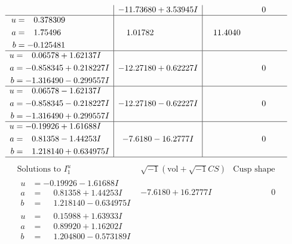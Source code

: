 \documentclass[1p]{elsarticle_modified}
\theoremstyle{definition}
\newcommand{\I}{\sqrt{-1}}
\begin{document}
$$\begin{array}{c|c|c}
 & -11.73680 + 3.53945 I & \phantom{-0.000000 } 0 \\ \hline\begin{aligned}
u &= \phantom{-}0.378309\phantom{ +0.000000I} \\
a &= \phantom{-}1.75496\phantom{ +0.000000I} \\
b &= -0.125481\phantom{ +0.000000I}\end{aligned}
 & \phantom{-}1.01782\phantom{ +0.000000I} & \phantom{-}11.4040\phantom{ +0.000000I} \\ \hline\begin{aligned}
u &= \phantom{-}0.06578 + 1.62137 I \\
a &= -0.858345 + 0.218227 I \\
b &= -1.316490 - 0.299557 I\end{aligned}
 & -12.27180 + 0.62227 I & \phantom{-0.000000 } 0 \\ \hline\begin{aligned}
u &= \phantom{-}0.06578 - 1.62137 I \\
a &= -0.858345 - 0.218227 I \\
b &= -1.316490 + 0.299557 I\end{aligned}
 & -12.27180 - 0.62227 I & \phantom{-0.000000 } 0 \\ \hline\begin{aligned}
u &= -0.19926 + 1.61688 I \\
a &= \phantom{-}0.81358 - 1.44253 I \\
b &= \phantom{-}1.218140 + 0.634975 I\end{aligned}
 & -7.6180 - 16.2777 I & \phantom{-0.000000 } 0\\
 \hline 
 \end{array}$$\newpage$$\begin{array}{c|c|c}  
\text{Solutions to }I^u_{1}& \I (\text{vol} + \sqrt{-1}CS) & \text{Cusp shape}\\
 \hline 
\begin{aligned}
u &= -0.19926 - 1.61688 I \\
a &= \phantom{-}0.81358 + 1.44253 I \\
b &= \phantom{-}1.218140 - 0.634975 I\end{aligned}
 & -7.6180 + 16.2777 I & \phantom{-0.000000 } 0 \\ \hline\begin{aligned}
u &= \phantom{-}0.15988 + 1.63933 I \\
a &= \phantom{-}0.89920 + 1.16202 I \\
b &= \phantom{-}1.204800 - 0.573189 I\end{aligned}

\end{array}$$
\end{document}
